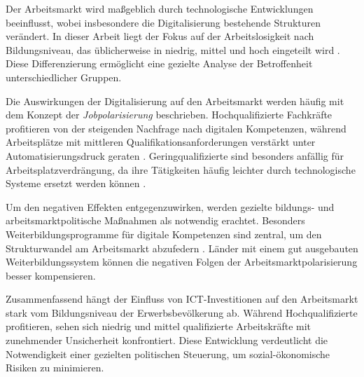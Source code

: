 Der Arbeitsmarkt wird maßgeblich durch technologische Entwicklungen beeinflusst,
wobei insbesondere die Digitalisierung bestehende Strukturen verändert. In dieser
Arbeit liegt der Fokus auf der Arbeitslosigkeit nach Bildungsniveau, das üblicherweise
in niedrig, mittel und hoch eingeteilt wird \parencite[vgl.][S. 35–37]{frey2013thefuture}.
Diese Differenzierung ermöglicht eine gezielte Analyse der Betroffenheit
unterschiedlicher Gruppen.

Die Auswirkungen der Digitalisierung auf den Arbeitsmarkt werden häufig mit dem
Konzept der \textit{Jobpolarisierung} beschrieben. Hochqualifizierte Fachkräfte 
profitieren von der steigenden Nachfrage nach digitalen Kompetenzen, während 
Arbeitsplätze mit mittleren Qualifikationsanforderungen verstärkt unter 
Automatisierungsdruck geraten \parencite[vgl.][S. 40]{autor2015whyare}. 
Geringqualifizierte sind besonders anfällig für Arbeitsplatzverdrängung, da ihre 
Tätigkeiten häufig leichter durch technologische Systeme ersetzt werden können 
\parencite[vgl.][S. 10]{acemoglu2002technical}.

Um den negativen Effekten entgegenzuwirken, werden gezielte bildungs- und
arbeitsmarktpolitische Maßnahmen als notwendig erachtet. Besonders
Weiterbildungsprogramme für digitale Kompetenzen sind zentral, um den
Strukturwandel am Arbeitsmarkt abzufedern 
\parencite[vgl.][S. 75]{brynjolfsson2014thesecond}. Länder mit einem gut ausgebauten 
Weiterbildungssystem können die negativen Folgen der Arbeitsmarktpolarisierung besser 
kompensieren.

Zusammenfassend hängt der Einfluss von \ac{ICT}-Investitionen auf den Arbeitsmarkt
stark vom Bildungsniveau der Erwerbsbevölkerung ab. Während Hochqualifizierte
profitieren, sehen sich niedrig und mittel qualifizierte Arbeitskräfte mit zunehmender
Unsicherheit konfrontiert. Diese Entwicklung verdeutlicht die Notwendigkeit einer
gezielten politischen Steuerung, um sozial-ökonomische Risiken zu minimieren.
